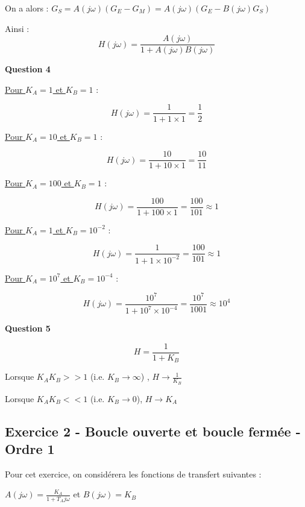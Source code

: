 \documentclass[a4paper,11pt,twoside]{book} %
\begin{document}
On a alors : $G_S = A(j \omega) (G_E - G_M) = A(j \omega) (G_E - B(j \omega) G_S)$

Ainsi : $$\boxed{H(j \omega) = \frac{A(j \omega)}{1 + A(j \omega) B(j \omega)}}$$


\noindent\hrulefill

\medskip
\textbf{Question 4}

\underline{Pour $K_A = 1$ et $K_B = 1$} :

$$H(j \omega) = \frac{1}{1 + 1 \times 1} = \frac{1}{2}$$

\medskip

\underline{Pour $K_A = 10$ et $K_B = 1$} :

$$H(j \omega) = \frac{10}{1 + 10 \times 1} = \frac{10}{11}$$

\medskip

\underline{Pour $K_A = 100$ et $K_B = 1$} :

$$H(j \omega) = \frac{100}{1 + 100 \times 1} = \frac{100}{101} \approx 1$$

\medskip

\underline{Pour $K_A = 1$ et $K_B = 10^{-2}$} :

$$H(j \omega) = \frac{1}{1 + 1 \times 10^{-2}} = \frac{100}{101} \approx 1$$

\medskip

\underline{Pour $K_A = 10^7$ et $K_B = 10^{-4}$} :

$$H(j \omega) = \frac{10^7}{1 + 10^7 \times 10^{-4}} = \frac{10^7}{1001} \approx 10^4$$



\noindent\hrulefill

\medskip
\textbf{Question 5}

$$H = \frac{1}{1 + K_B}$$

Lorsque $K_A K_B >> 1$ (i.e. $K_B \to \infty$) , $H \to \frac{1}{K_B}$

Lorsque $K_A K_B << 1$ (i.e. $K_B \to 0$), $H \to K_A$


\newpage
\subsection{Exercice 2 - Boucle ouverte et boucle fermée - Ordre 1}

Pour cet exercice, on considérera les fonctions de transfert suivantes : 

$A(j \omega) = \frac{K_A}{1 + T_A j \omega}$ et $B(j \omega) = K_B$
\end{document}
